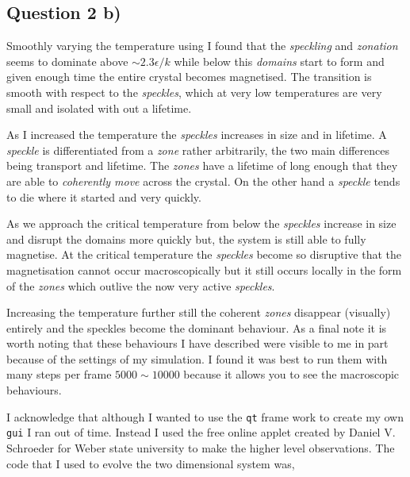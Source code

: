 \documentclass[a4paper, twocolumn]{article}
\begin{document}
\subsection*{Question 2 b)}
Smoothly varying the temperature using I found that the \emph{speckling} %
and \emph{zonation} seems to dominate above \(\sim 2.3 \epsilon / k\) %
while below this \emph{domains} start to form and given enough time %
the entire crystal becomes magnetised. The transition is smooth %
with respect to the \emph{speckles}, which at very low temperatures %
are very small and isolated with out a lifetime. 


As I increased the temperature the \emph{speckles} increases in size and %
in lifetime. A \emph{speckle} is differentiated from a \emph{zone} rather %
arbitrarily, the two main differences being transport and lifetime. The %
\emph{zones} have a lifetime of long enough that they are able to %
\emph{coherently move} across the crystal. On the other hand a \emph{speckle} %
tends to die where it started and very quickly. 


As we approach the critical temperature from below the \emph{speckles} %
increase in size and disrupt the domains more quickly but, the system %
is still able to fully magnetise. At the critical temperature the %
\emph{speckles} become so disruptive that the magnetisation cannot occur %
macroscopically but it still occurs locally in the form of the \emph{zones} %
which outlive the now very active \emph{speckles}. 


Increasing the temperature further still the coherent \emph{zones} %
disappear (visually) entirely and the speckles become the dominant %
behaviour. As a final note it is worth noting that these behaviours %
I have described were visible to me in part because of the settings %
of my simulation. I found it was best to run them with many steps %
per frame \(5000 \sim 10000\) because it allows you to see the %
macroscopic behaviours. 


I acknowledge that although I wanted to use the \verb!qt! frame work %
to create my own \verb!gui! I ran out of time. Instead I used the %
free online applet created by Daniel V. Schroeder for Weber state %
university to make the higher level observations. The code that I used %
to evolve the two dimensional system was, 
\end{document}

